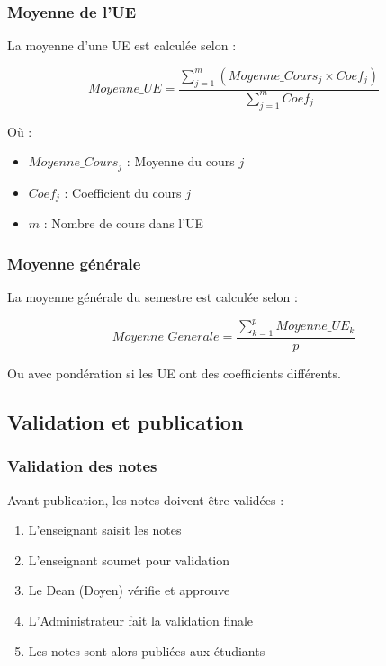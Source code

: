 \subsubsection{Moyenne de l'UE}

La moyenne d'une UE est calculée selon :

\begin{equation}
Moyenne\_UE = \frac{\sum_{j=1}^{m} (Moyenne\_Cours_j \times Coef_j)}{\sum_{j=1}^{m} Coef_j}
\end{equation}

Où :
\begin{itemize}[leftmargin=*]
    \item $Moyenne\_Cours_j$ : Moyenne du cours $j$
    \item $Coef_j$ : Coefficient du cours $j$
    \item $m$ : Nombre de cours dans l'UE
\end{itemize}

\subsubsection{Moyenne générale}

La moyenne générale du semestre est calculée selon :

\begin{equation}
Moyenne\_Generale = \frac{\sum_{k=1}^{p} Moyenne\_UE_k}{p}
\end{equation}

Ou avec pondération si les UE ont des coefficients différents.

\subsection{Validation et publication}

\subsubsection{Validation des notes}

Avant publication, les notes doivent être validées :

\begin{enumerate}[leftmargin=*]
    \item L'enseignant saisit les notes
    \item L'enseignant soumet pour validation
    \item Le Dean (Doyen) vérifie et approuve
    \item L'Administrateur fait la validation finale
    \item Les notes sont alors publiées aux étudiants
\end{enumerate}


